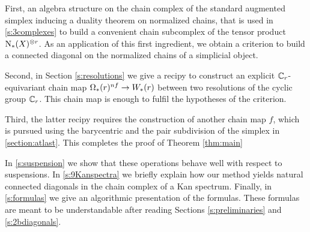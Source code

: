 First, an algebra structure on the chain complex of the standard augmented simplex inducing a duality theorem on normalized chains, that is used in \cref{s:3complexes} to build a convenient chain subcomplex of the tensor product $\operatorname{N}_{*}(X)^{\otimes r}$.
As an application of this first ingredient, we obtain a criterion to build a connected diagonal on the normalized chains of a simplicial object.


Second, in Section \ref{s:resolutions} we give a recipy to construct an explicit $\mathbb{C}_r$-equivariant chain map $\Omega_*(r)^{nf} \to W_*(r)$ between two resolutions of the cyclic group $\mathbb{C}_r$. This chain map is enough to fulfil the hypotheses of the criterion.

Third, the latter recipy requires the construction of another chain map $f$, which is pursued using the barycentric and the pair subdivision of the simplex in \cref{section:atlast}. This completes the proof of Theorem \ref{thm:main}

In \cref{s:suspension} we show that these operations behave well with respect to suspensions.
In \cref{s:9Kanspectra} we briefly explain how our method yields natural connected diagonals in the chain complex of a Kan spectrum.
Finally, in \cref{s:formulas} we give an algorithmic presentation of the formulas.
These formulas are meant to be understandable after reading Sections \ref{s:preliminaries} and \ref{s:2bdiagonals}.